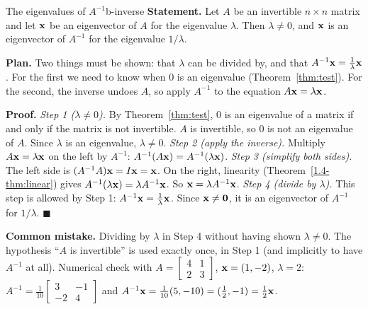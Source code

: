 \documentclass[11pt]{article}
\begin{document}
\begin{exmp}{The eigenvalues of $A^{-1}$}{b-inverse}
\textbf{Statement.} Let $A$ be an invertible $n\times n$ matrix and let $\mathbf{x}$ be an eigenvector of $A$ for the eigenvalue $\lambda$. Then $\lambda\neq0$, and $\mathbf{x}$ is an eigenvector of $A^{-1}$ for the eigenvalue $1/\lambda$.

\textbf{Plan.} Two things must be shown: that $\lambda$ can be divided by, and that $A^{-1}\mathbf{x}=\frac{1}{\lambda}\mathbf{x}$. For the first we need to know when $0$ is an eigenvalue (Theorem~\ref{thm:test}). For the second, the inverse undoes $A$, so apply $A^{-1}$ to the equation $A\mathbf{x}=\lambda\mathbf{x}$.

\textbf{Proof.}
\emph{Step 1 ($\lambda\neq0$).} By Theorem~\ref{thm:test}, $0$ is an eigenvalue of a matrix if and only if the matrix is not invertible. $A$ is invertible, so $0$ is not an eigenvalue of $A$. Since $\lambda$ is an eigenvalue, $\lambda\neq0$.
\emph{Step 2 (apply the inverse).} Multiply $A\mathbf{x}=\lambda\mathbf{x}$ on the left by $A^{-1}$: $A^{-1}(A\mathbf{x})=A^{-1}(\lambda\mathbf{x})$.
\emph{Step 3 (simplify both sides).} The left side is $(A^{-1}A)\mathbf{x}=I\mathbf{x}=\mathbf{x}$. On the right, linearity (Theorem~\ref{1.4-thm:linear}) gives $A^{-1}(\lambda\mathbf{x})=\lambda A^{-1}\mathbf{x}$. So $\mathbf{x}=\lambda A^{-1}\mathbf{x}$.
\emph{Step 4 (divide by $\lambda$).} This step is allowed by Step 1: $A^{-1}\mathbf{x}=\frac{1}{\lambda}\mathbf{x}$. Since $\mathbf{x}\neq\mathbf{0}$, it is an eigenvector of $A^{-1}$ for $1/\lambda$. \qquad$\blacksquare$

\textbf{Common mistake.} Dividing by $\lambda$ in Step 4 without having shown $\lambda\neq0$. The hypothesis ``$A$ is invertible'' is used exactly once, in Step 1 (and implicitly to have $A^{-1}$ at all). Numerical check with $A=\begin{bmatrix}4&1\\2&3\end{bmatrix}$, $\mathbf{x}=(1,-2)$, $\lambda=2$: $A^{-1}=\tfrac{1}{10}\begin{bmatrix}3&-1\\-2&4\end{bmatrix}$ and $A^{-1}\mathbf{x}=\tfrac{1}{10}(5,-10)=(\tfrac12,-1)=\tfrac12\mathbf{x}$.
\end{exmp}
\end{document}
